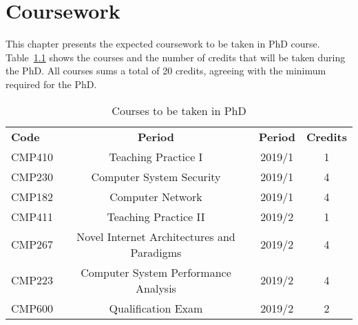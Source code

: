 \chapter{Coursework}\label{cap:coursework}
\thispagestyle{empty}

This chapter presents the expected coursework to be taken in PhD course. Table~\ref{tab:phd-courses} shows the courses and the number of credits that will be taken during the PhD. All courses sums a total of 20 credits, agreeing with the minimum required for the PhD.

\begin{table}[htp]
\centering
\begin{tabularx}{\textwidth}{ l | c | c | c}
\hline
{\bf Code} & {\bf Period} & \textbf{Period} & \textbf{Credits} \\ 
CMP410 & Teaching Practice I & 2019/1 & 1 \\
CMP230 & Computer System Security & 2019/1 & 4 \\
CMP182 & Computer Network & 2019/1 & 4 \\
CMP411 & Teaching Practice II & 2019/2 & 1 \\
CMP267 & Novel Internet Architectures and Paradigms & 2019/2 & 4 \\
CMP223 & Computer System Performance Analysis & 2019/2 & 4 \\
CMP600 & Qualification Exam & 2019/2 & 2 \\

\hline
\end{tabularx}
\caption{Courses to be taken in PhD}
\label{tab:phd-courses}
\end{table}

